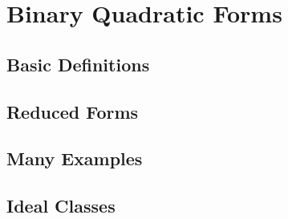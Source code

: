 \documentclass[../notes.tex]{subfiles}
\begin{document}
\section{Binary Quadratic Forms}

\subsection{Basic Definitions}

\subsection{Reduced Forms}

\subsection{Many Examples} \label{subsec:compute-primes-of-form}

\subsection{Ideal Classes}
\end{document}
